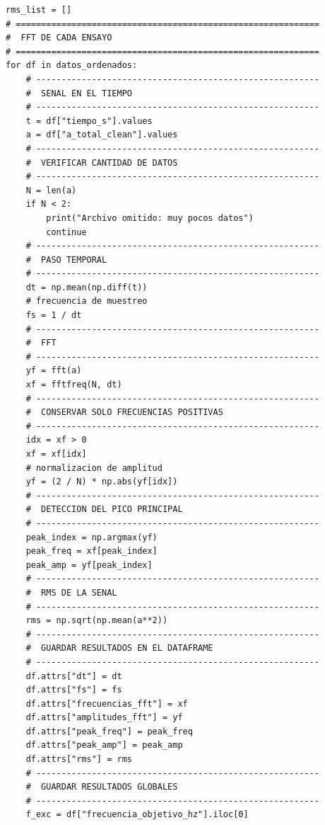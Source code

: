 \documentclass[10pt]{article}
\begin{document}
\begin{lstlisting}
rms_list = []
# ============================================================
#  FFT DE CADA ENSAYO
# ============================================================
for df in datos_ordenados:
    # --------------------------------------------------------
    #  SENAL EN EL TIEMPO
    # --------------------------------------------------------
    t = df["tiempo_s"].values
    a = df["a_total_clean"].values
    # --------------------------------------------------------
    #  VERIFICAR CANTIDAD DE DATOS
    # --------------------------------------------------------
    N = len(a)
    if N < 2:
        print("Archivo omitido: muy pocos datos")
        continue
    # --------------------------------------------------------
    #  PASO TEMPORAL
    # --------------------------------------------------------
    dt = np.mean(np.diff(t))
    # frecuencia de muestreo
    fs = 1 / dt
    # --------------------------------------------------------
    #  FFT
    # --------------------------------------------------------
    yf = fft(a)
    xf = fftfreq(N, dt)
    # --------------------------------------------------------
    #  CONSERVAR SOLO FRECUENCIAS POSITIVAS
    # --------------------------------------------------------
    idx = xf > 0
    xf = xf[idx]
    # normalizacion de amplitud
    yf = (2 / N) * np.abs(yf[idx])
    # --------------------------------------------------------
    #  DETECCION DEL PICO PRINCIPAL
    # --------------------------------------------------------
    peak_index = np.argmax(yf)
    peak_freq = xf[peak_index]
    peak_amp = yf[peak_index]
    # --------------------------------------------------------
    #  RMS DE LA SENAL
    # --------------------------------------------------------
    rms = np.sqrt(np.mean(a**2))
    # --------------------------------------------------------
    #  GUARDAR RESULTADOS EN EL DATAFRAME
    # --------------------------------------------------------
    df.attrs["dt"] = dt
    df.attrs["fs"] = fs
    df.attrs["frecuencias_fft"] = xf
    df.attrs["amplitudes_fft"] = yf
    df.attrs["peak_freq"] = peak_freq
    df.attrs["peak_amp"] = peak_amp
    df.attrs["rms"] = rms
    # --------------------------------------------------------
    #  GUARDAR RESULTADOS GLOBALES
    # --------------------------------------------------------
    f_exc = df["frecuencia_objetivo_hz"].iloc[0]


\end{lstlisting}
\end{document}
